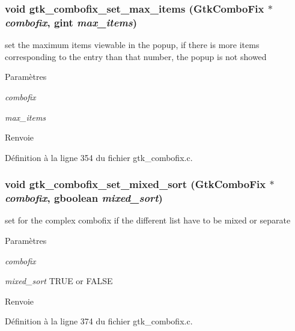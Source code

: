 \subsubsection[{gtk\_\-combofix\_\-set\_\-max\_\-items}]{\setlength{\rightskip}{0pt plus 5cm}void gtk\_\-combofix\_\-set\_\-max\_\-items ({\bf GtkComboFix} $\ast$ {\em combofix}, \/  gint {\em max\_\-items})}\label{gtk__combofix_8h_a5f12519f66c3da8248e512bf6b584d29}
set the maximum items viewable in the popup, if there is more items corresponding to the entry than that number, the popup is not showed


\begin{DoxyParams}{Paramètres}
\item[{\em combofix}]\item[{\em max\_\-items}]\end{DoxyParams}
\begin{DoxyReturn}{Renvoie}

\end{DoxyReturn}


Définition à la ligne 354 du fichier gtk\_\-combofix.c.

\subsubsection[{gtk\_\-combofix\_\-set\_\-mixed\_\-sort}]{\setlength{\rightskip}{0pt plus 5cm}void gtk\_\-combofix\_\-set\_\-mixed\_\-sort ({\bf GtkComboFix} $\ast$ {\em combofix}, \/  gboolean {\em mixed\_\-sort})}\label{gtk__combofix_8h_a4d9749a858856cb3818749500a0a3d86}
set for the complex combofix if the different list have to be mixed or separate


\begin{DoxyParams}{Paramètres}
\item[{\em combofix}]\item[{\em mixed\_\-sort}]TRUE or FALSE\end{DoxyParams}
\begin{DoxyReturn}{Renvoie}

\end{DoxyReturn}


Définition à la ligne 374 du fichier gtk\_\-combofix.c.

